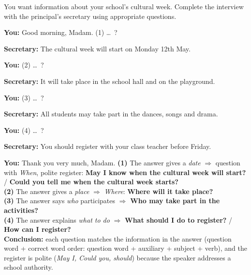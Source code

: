 \documentclass[11pt]{article}
\begin{document}
\begin{exoresolu}
You want information about your school's cultural week. Complete the interview with the principal's secretary using appropriate questions.\par
\textbf{You:} Good morning, Madam. (1) \ldots\ ?\par
\textbf{Secretary:} The cultural week will start on Monday 12th May.\par
\textbf{You:} (2) \ldots\ ?\par
\textbf{Secretary:} It will take place in the school hall and on the playground.\par
\textbf{You:} (3) \ldots\ ?\par
\textbf{Secretary:} All students may take part in the dances, songs and drama.\par
\textbf{You:} (4) \ldots\ ?\par
\textbf{Secretary:} You should register with your class teacher before Friday.\par
\textbf{You:} Thank you very much, Madam.
\tcblower
\textbf{(1)} The answer gives a \emph{date} $\Rightarrow$ question with \emph{When}, polite register: \textbf{May I know when the cultural week will start?} / \textbf{Could you tell me when the cultural week starts?}\\
\textbf{(2)} The answer gives a \emph{place} $\Rightarrow$ \emph{Where}: \textbf{Where will it take place?}\\
\textbf{(3)} The answer says \emph{who} participates $\Rightarrow$ \textbf{Who may take part in the activities?}\\
\textbf{(4)} The answer explains \emph{what to do} $\Rightarrow$ \textbf{What should I do to register?} / \textbf{How can I register?}\\
\textbf{Conclusion:} each question matches the information in the answer (question word + correct word order: question word + auxiliary + subject + verb), and the register is polite (\emph{May I, Could you, should}) because the speaker addresses a school authority.
\end{exoresolu}
\end{document}
